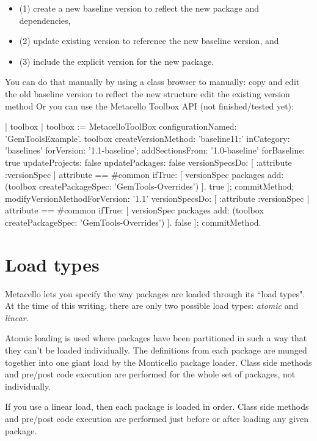 \documentclass[a4paper,10pt,twoside]{book}
\begin{document}
\begin{code}{}
\begin{code}{}
\begin{itemize}
\item (1) create a new baseline version to reflect the new package and dependencies, 
\item (2) update existing  version to reference the new baseline version, and 
\item (3) include the explicit version for the new package.
\end{itemize}

You can do that manually by using a class browser to manually:
copy and edit the old baseline version to reflect the new structure
edit the existing  version method
Or you can use the Metacello Toolbox API (not finished/tested yet):

\begin{code}{}
| toolbox |
toolbox := MetacelloToolBox configurationNamed: 'GemToolsExample'.
toolbox
  createVersionMethod: 'baseline11:' inCategory: 'baselines' forVersion: '1.1-baseline';
  addSectionsFrom: '1.0-baseline'
     forBaseline: true
     updateProjects: false
     updatePackages: false
     versionSpecsDo: [ :attribute :versionSpec |
        attribute == #common
          ifTrue: [ versionSpec packages add: (toolbox createPackageSpec: 'GemTools-Overrides') ].
        true ];
  commitMethod;
  modifyVersionMethodForVersion: '1.1'
     versionSpecsDo: [ :attribute :versionSpec |
        attribute == #common
          ifTrue: [ versionSpec packages add: (toolbox createPackageSpec: 'GemTools-Overrides') ].
        false ];
  commitMethod.
\end{code}


\section{Load types}
Metacello lets you specify the way packages are loaded through its ``load types". At the time of this writing, there are only two possible load types: \emph{atomic} and \emph{linear}. 

Atomic loading is used where packages have been partitioned in such a way that they can't be loaded individually. The definitions from each package are munged together into one giant load by the Monticello package loader. Class side  methods and pre/post code execution are performed for the whole set of packages, not individually. 

If you use a linear load, then each package is loaded in order. Class side  methods and pre/post code execution are performed just before or after loading any given package.


\end{code}
\end{code}
\end{document}

